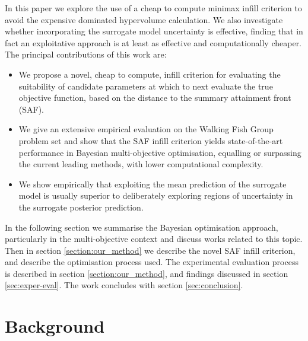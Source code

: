 \documentclass[conference]{IEEEtran}
\newcommand{\mnotejf}[2][\textcolor{blue}{\dagger}]{$#1$\marginpar{\color{blue}\raggedright\tiny$#1$ #2}}
\begin{document}
In this paper we explore the use of a cheap to compute minimax infill criterion to avoid the expensive dominated hypervolume calculation.  We also investigate whether incorporating the surrogate model uncertainty is effective, finding that in fact an exploitative approach is at least as effective and computationally cheaper. The principal contributions of this work are:
\begin{itemize}[left=0pt .. \parindent]
    \item We propose a novel, cheap to compute, infill criterion for evaluating the suitability of candidate parameters at  which to next evaluate the true objective function, %
    based on the distance to the summary attainment front (SAF). 
    \item We give an extensive empirical evaluation on the Walking Fish Group problem set \cite{huband2005scalable} and show that the SAF infill criterion yields state-of-the-art performance in Bayesian multi-objective optimisation, equalling or surpassing the current leading methods, with lower computational complexity. 
    \item We show empirically that exploiting the mean prediction of the surrogate model is  usually superior to deliberately exploring regions of uncertainty in the surrogate posterior prediction.  
\end{itemize}

In the following section we summarise the Bayesian optimisation approach, particularly in the multi-objective context and discuss works related to this topic.  Then in section \ref{section:our_method} we describe the novel SAF infill criterion, and describe the optimisation process used.  The experimental evaluation process is described in section \ref{section:our_method}, and findings discussed in section \ref{sec:exper-eval}. The work concludes with section \ref{sec:conclusion}.


\section{Background}
\end{document}
